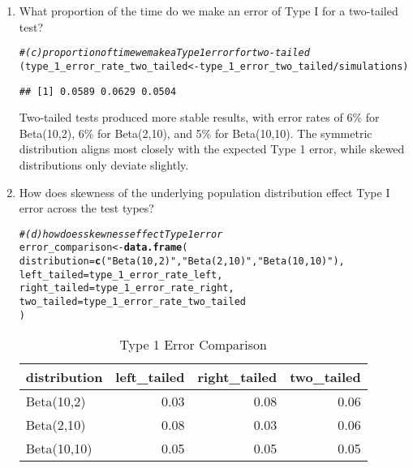 \documentclass{article}\usepackage[]{graphicx}\usepackage[]{xcolor}
\makeatletter
\newcommand{\hlsng}[1]{\textcolor[rgb]{0.192,0.494,0.8}{#1}}%
\newcommand{\hlcom}[1]{\textcolor[rgb]{0.678,0.584,0.686}{\textit{#1}}}%
\newcommand{\hlopt}[1]{\textcolor[rgb]{0,0,0}{#1}}%
\newcommand{\hldef}[1]{\textcolor[rgb]{0.345,0.345,0.345}{#1}}%
\newcommand{\hlkwb}[1]{\textcolor[rgb]{0.69,0.353,0.396}{#1}}%
\newcommand{\hlkwc}[1]{\textcolor[rgb]{0.333,0.667,0.333}{#1}}%
\newcommand{\hlkwd}[1]{\textcolor[rgb]{0.737,0.353,0.396}{\textbf{#1}}}%
\newenvironment{kframe}{%
 \def\at@end@of@kframe{}%
 \ifinner\ifhmode%
  \def\at@end@of@kframe{\end{minipage}}%
  \begin{minipage}{\columnwidth}%
 \fi\fi%
 \def\FrameCommand##1{\hskip\@totalleftmargin \hskip-\fboxsep
 \colorbox{shadecolor}{##1}\hskip-\fboxsep
     \hskip-\linewidth \hskip-\@totalleftmargin \hskip\columnwidth}%
 \MakeFramed {\advance\hsize-\width
   \@totalleftmargin\z@ \linewidth\hsize
   \@setminipage}}%
 {\par\unskip\endMakeFramed%
 \at@end@of@kframe}
\newenvironment{knitrout}{}{} %
\makeatother
\begin{document}
\begin{enumerate}
\begin{enumerate}
    \item What proportion of the time do we make an error of Type I for a
    two-tailed test?
    
\begin{knitrout}\scriptsize
{}\color{fgcolor}\begin{kframe}
\begin{alltt}
  \hlcom{# (c) proportion of time we make a Type 1 error for two-tailed}
\hldef{(type_1_error_rate_two_tailed} \hlkwb{<-} \hldef{type_1_error_two_tailed} \hlopt{/} \hldef{simulations)}
\end{alltt}
\begin{verbatim}
## [1] 0.0589 0.0629 0.0504
\end{verbatim}
\end{kframe}
\end{knitrout}
    
    Two-tailed tests produced more stable results, with error rates of 6\% for Beta(10,2), 6\% for Beta(2,10), and 5\% for Beta(10,10). The symmetric distribution aligns most closely with the expected Type 1 error, while skewed distributions only deviate slightly.
    
    \item How does skewness of the underlying population distribution effect
    Type I error across the test types?
    
\begin{knitrout}\scriptsize
{}\color{fgcolor}\begin{kframe}
\begin{alltt}
 \hlcom{# (d) how does skewness effect Type 1 error}
\hldef{error_comparison} \hlkwb{<-} \hlkwd{data.frame}\hldef{(}
  \hlkwc{distribution} \hldef{=} \hlkwd{c}\hldef{(}\hlsng{"Beta(10,2)"}\hldef{,} \hlsng{"Beta(2,10)"}\hldef{,} \hlsng{"Beta(10,10)"}\hldef{),}
  \hlkwc{left_tailed} \hldef{= type_1_error_rate_left,}
  \hlkwc{right_tailed} \hldef{= type_1_error_rate_right,}
  \hlkwc{two_tailed} \hldef{= type_1_error_rate_two_tailed}
\hldef{)}
\end{alltt}
\end{kframe}
\end{knitrout}
    

  
\begin{table}[H]
\centering
\begingroup\small
\begin{tabular}{lrrr}
  \hline
distribution & left\_tailed & right\_tailed & two\_tailed \\ 
  \hline
Beta(10,2) & 0.03 & 0.08 & 0.06 \\ 
  Beta(2,10) & 0.08 & 0.03 & 0.06 \\ 
  Beta(10,10) & 0.05 & 0.05 & 0.05 \\ 
   \hline
\end{tabular}
\endgroup
\caption{Type 1 Error Comparison} 
\label{errorcomparison}
\end{table}



\end{enumerate}
\end{enumerate}
\end{document}
